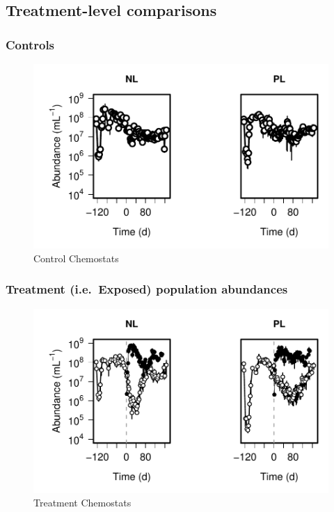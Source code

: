 \documentclass[]{article}
\begin{document}
\subsection{Treatment-level
comparisons}\label{treatment-level-comparisons}

\subsubsection{Controls}\label{controls}

\begin{figure}[htbp]
\centering
\includegraphics{analysis_ecoevostoich_files/figure-latex/unnamed-chunk-6-1.pdf}
\caption{Control Chemostats}
\end{figure}

\subsubsection{Treatment (i.e.~Exposed) population
abundances}\label{treatment-i.e.exposed-population-abundances}

\begin{figure}[htbp]
\centering
\includegraphics{analysis_ecoevostoich_files/figure-latex/unnamed-chunk-7-1.pdf}
\caption{Treatment Chemostats}
\end{figure}
\end{document}
